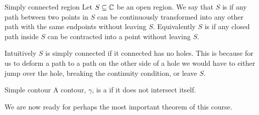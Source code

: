\documentclass{article}
\begin{document}
    \begin{definition}{Simply connected region}{}
        Let \(S\subseteq\mathbb{C}\) be an open region.
        We say that \(S\) is  if any path between two points in \(S\) can be continuously transformed into any other path with the same endpoints without leaving \(S\).
        Equivalently \(S\) is  if any closed path inside \(S\) can be contracted into a point without leaving \(S\).
    \end{definition}
    Intuitively \(S\) is simply connected if it connected has no holes.
    This is because for us to deform a path to a path on the other side of a hole we would have to either jump over the hole, breaking the continuity condition, or leave \(S\).
    
    \begin{definition}{Simple contour}{}
        A contour, \(\gamma\), is a  if it does not intersect itself.
    \end{definition}
    We are now ready for perhaps the most important theorem of this course.
    
\end{document}
